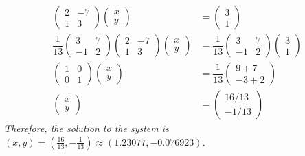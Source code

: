 \documentclass[12pt,letterpaper]{exam}
\begin{document}
\begin{questions}
\begin{parts}
{ \itshape
	\[
	\begin{aligned}
	\begin{pmatrix}
	2 & -7 \\
	1 & 3
	\end{pmatrix}
	\begin{pmatrix} x \\ y \end{pmatrix}&= 
	\begin{pmatrix} 3 \\ 1 \end{pmatrix} \\[0.2cm]
	\dfrac{1}{13}
	\begin{pmatrix}
	3 & 7 \\
	-1 & 2
	\end{pmatrix}
	\begin{pmatrix}
	2 & -7 \\
	1 & 3
	\end{pmatrix}
	\begin{pmatrix} x \\ y \end{pmatrix}&= 
	\dfrac{1}{13}
	\begin{pmatrix}
	3 & 7 \\
	-1 & 2
	\end{pmatrix}
	\begin{pmatrix} 3 \\ 1 \end{pmatrix}  \\[0.2cm]
	\begin{pmatrix} 1 & 0 \\ 0 & 1 \end{pmatrix}
	\begin{pmatrix} x \\ y \end{pmatrix}&= 
	\dfrac{1}{13}
	\begin{pmatrix}
	9 + 7 \\
	-3 + 2
	\end{pmatrix} \\[0.2cm]
	\begin{pmatrix} x \\ y \end{pmatrix}&=
	\begin{pmatrix} 16/13 \\ -1/13 \end{pmatrix}
	\end{aligned}
	\]
Therefore, the solution to the system is $(x, y)= (\frac{16}{13}, -\frac{1}{13}) \approx (1.23077, -0.076923)$. 
}
\end{parts}


\end{questions}
\end{document}
